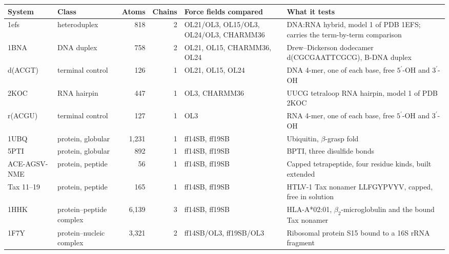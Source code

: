 \begin{tabular}{@{}llrrp{3.1cm}p{4.5cm}@{}}
\toprule
System & Class & Atoms & Chains & Force fields compared & What it tests \\
\midrule
1efs & heteroduplex & 818 & 2 & OL21/OL3, OL15/OL3, OL24/OL3, CHARMM36 & DNA:RNA hybrid, model 1 of PDB 1EFS; carries the term-by-term comparison \\
1BNA & DNA duplex & 758 & 2 & OL21, OL15, CHARMM36, OL24 & Drew--Dickerson dodecamer d(CGCGAATTCGCG), B-DNA duplex \\
d(ACGT) & terminal control & 126 & 1 & OL21, OL15, OL24 & DNA 4-mer, one of each base, free $5^\prime$-OH and $3^\prime$-OH \\
2KOC & RNA hairpin & 447 & 1 & OL3, CHARMM36 & UUCG tetraloop RNA hairpin, model 1 of PDB 2KOC \\
r(ACGU) & terminal control & 127 & 1 & OL3 & RNA 4-mer, one of each base, free $5^\prime$-OH and $3^\prime$-OH \\
1UBQ & protein, globular & 1,231 & 1 & ff14SB, ff19SB & Ubiquitin, $\beta$-grasp fold \\
5PTI & protein, globular & 892 & 1 & ff14SB, ff19SB & BPTI, three disulfide bonds \\
ACE-AGSV-NME & protein, peptide & 56 & 1 & ff14SB, ff19SB & Capped tetrapeptide, four residue kinds, built extended \\
Tax 11--19 & protein, peptide & 165 & 1 & ff14SB, ff19SB & HTLV-1 Tax nonamer LLFGYPVYV, capped, free in solution \\
1HHK & protein--peptide complex & 6,139 & 3 & ff14SB, ff19SB & HLA-A*02:01, $\beta_2$-microglobulin and the bound Tax nonamer \\
1F7Y & protein--nucleic complex & 3,321 & 2 & ff14SB/OL3, ff19SB/OL3 & Ribosomal protein S15 bound to a 16S rRNA fragment \\
\bottomrule
\end{tabular}
